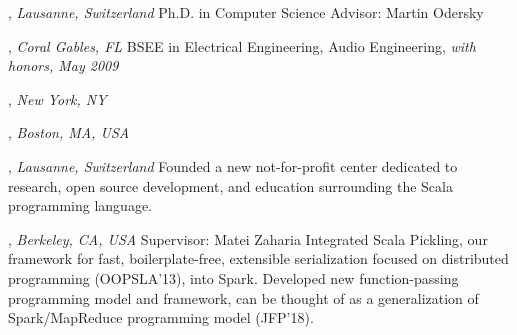 \documentclass[9pt]{article}
\begin{document}



, \emph{Lausanne, Switzerland} \vspace{0.01in} 
\newline Ph.D. in Computer Science
\newline Advisor: Martin Odersky 

\bigskip

, \emph{Coral Gables, FL} \vspace{0.01in}  
\newline\noindent BSEE in Electrical Engineering, Audio Engineering, {\em with honors, May 2009}

\bigskip

, \emph{New York, NY} \vspace{0.01in}  

\bigskip

\medskip
{}

, \emph{Boston, MA, USA} \vspace{0.01in} 
\newline{}
\bigskip

, \emph{Lausanne, Switzerland} \vspace{0.01in} 
\newline{}
\newline\noindent Founded a new not-for-profit center dedicated to research,
\newline\noindent open source development, and education surrounding the Scala
\newline\noindent programming language.
\bigskip

, \emph{Berkeley, CA, USA} \vspace{0.01in} 
\newline{}
\newline\noindent Supervisor: Matei Zaharia
\newline\noindent Integrated Scala Pickling, our framework for fast, boilerplate-free, extensible
\newline\noindent serialization focused on distributed programming (OOPSLA'13), into Spark.
\newline\noindent Developed new function-passing programming model and framework, can be
\newline\noindent thought of as a generalization of Spark/MapReduce programming model (JFP'18).
\end{document}

